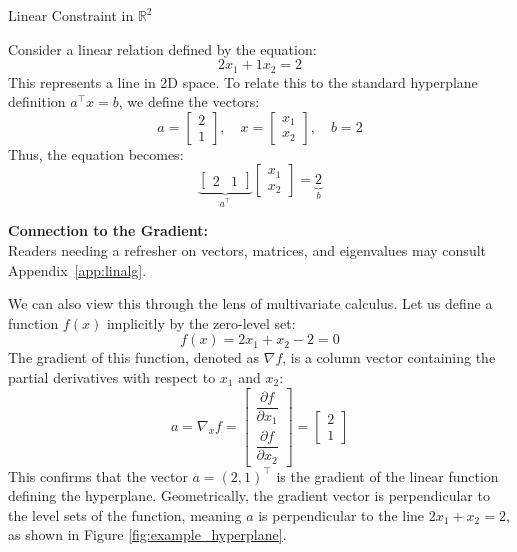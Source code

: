 \begin{examplebox}{Linear Constraint in $\mathbb{R}^2$}
	
	Consider a linear relation defined by the equation:
	\begin{equation}
		2x_1 + 1x_2 = 2
	\end{equation}
	This represents a line in 2D space. To relate this to the standard hyperplane definition $a^\top x = b$, we define the vectors:
	\begin{equation}
		a = \begin{bmatrix} 2 \\ 1 \end{bmatrix}, \quad x = \begin{bmatrix} x_1 \\ x_2 \end{bmatrix}, \quad b = 2
	\end{equation}
	Thus, the equation becomes:
	\begin{equation}
		\underbrace{\begin{bmatrix} 2 & 1 \end{bmatrix}}_{a^\top} \begin{bmatrix} x_1 \\ x_2 \end{bmatrix} = \underbrace{2}_{b}
	\end{equation}
	
	\textbf{Connection to the Gradient:}\\

	Readers needing a refresher on vectors, matrices, and eigenvalues may consult Appendix~\ref{app:linalg}.

	We can also view this through the lens of multivariate calculus. Let us define a function $f(x)$ implicitly by the zero-level set:
	\begin{equation}
		f(x) = 2x_1 + x_2 - 2 = 0
	\end{equation}
	The gradient of this function, denoted as $\nabla f$, is a column vector containing the partial derivatives with respect to $x_1$ and $x_2$:
	\begin{equation}
		a = \nabla_x f = \begin{bmatrix} \dfrac{\partial f}{\partial x_1} \\[12pt] \dfrac{\partial f}{\partial x_2} \end{bmatrix} = \begin{bmatrix} 2 \\ 1 \end{bmatrix}
	\end{equation}
	This confirms that the vector $a = (2, 1)^\top$ is the gradient of the linear function defining the hyperplane. Geometrically, the gradient vector is perpendicular to the level sets of the function, meaning $a$ is perpendicular to the line $2x_1 + x_2 = 2$, as shown in Figure \ref{fig:example_hyperplane}.
	

\end{examplebox}
